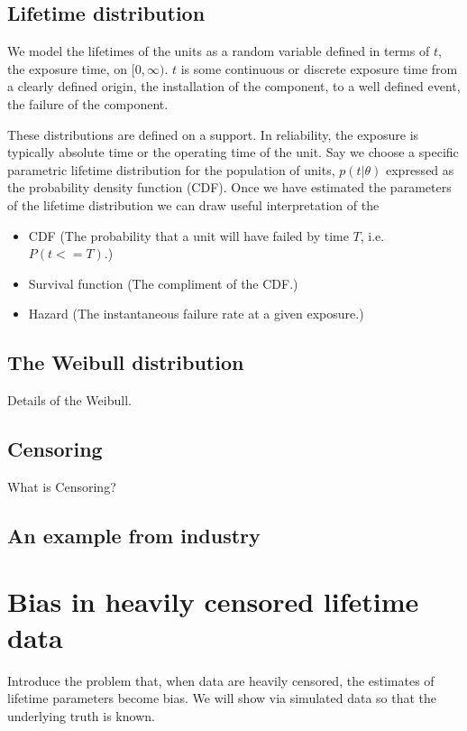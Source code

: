 \subsection{Lifetime distribution}

We model the lifetimes of the units as a random variable defined in terms of $t$, the exposure time, on $[0, \infty)$. $t$ is some continuous or discrete exposure time from a clearly defined origin, the installation of the component, to a well defined event, the failure of the component. 

These distributions are defined on a support. In reliability, the exposure is typically absolute time or the operating time of the unit. Say we choose a specific parametric lifetime distribution for the population of units, $p(t|\theta)$ expressed as the probability density function (CDF). Once we have estimated the parameters of the lifetime distribution we can draw useful interpretation of the

\begin{itemize}
    \item CDF (The probability that a unit will have failed by time $T$, i.e. $P(t <= T)$.)
    \item Survival function (The compliment of the CDF.)
    \item Hazard (The instantaneous failure rate at a given exposure.)
\end{itemize}

\subsection{The Weibull distribution}

Details of the Weibull.

\subsection{Censoring}

What is Censoring?

\subsection{An example from industry}

\section{Bias in heavily censored lifetime data}

Introduce the problem that, when data are heavily censored, the estimates of lifetime parameters become bias. We will show via simulated data so that the underlying truth is known.

